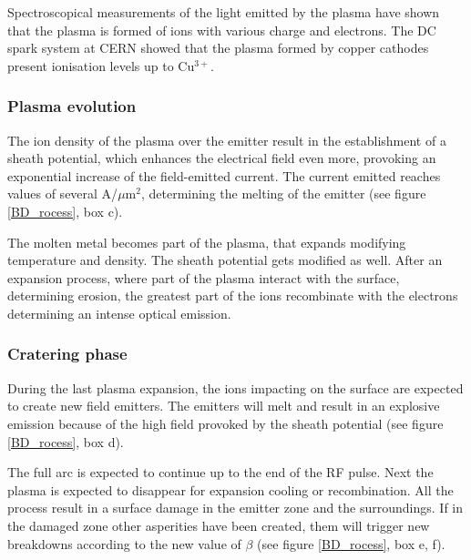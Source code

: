 Spectroscopical measurements of the light emitted by the plasma have shown that the plasma is formed of ions with various charge and electrons. The DC spark system at CERN showed that the plasma formed by copper cathodes present ionisation levels up to Cu$^{3+}$. \cite{find quote}


\subsubsection[Plasma evolution]{Plasma evolution}

The ion density of the plasma over the emitter result in the establishment of a sheath potential, which enhances the electrical field even more, provoking an exponential  increase of the field-emitted current. The current emitted reaches values of several A/$\mu$m$^2$, determining the melting of the emitter (see figure \ref{BD_rocess}, box c).

The molten metal becomes part of the plasma, that expands modifying temperature and density. The sheath potential gets modified as well. After an expansion process, where part of the plasma interact with the surface, determining erosion, the greatest part of the ions recombinate with the electrons determining an intense optical emission.


\subsubsection[Cratering phase]{Cratering phase}

During the last plasma expansion, the ions impacting on the surface are expected to create new field emitters. The emitters will melt and result in an explosive emission because of the high field provoked by the sheath potential (see figure \ref{BD_rocess}, box d). 

The full arc is expected to continue up to the end of the RF pulse. Next the plasma is expected to disappear for expansion cooling or recombination. All the process result in a surface damage in the emitter zone and the surroundings. If in the damaged zone other asperities have been created, them will trigger new breakdowns according to the new value of $\beta$ (see figure \ref{BD_rocess}, box e, f). 

